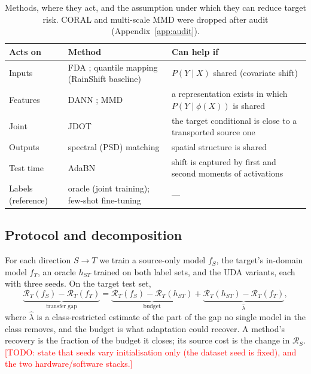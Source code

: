 \documentclass{article}
\newcommand{\todo}[1]{\textcolor{red}{[TODO: #1]}}
\newcommand{\lamhat}{\hat{\lambda}}
\begin{document}
\begin{table}[t]
\centering\small
\begin{tabularx}{\linewidth}{llX}
\toprule
Acts on & Method & Can help if \\
\midrule
Inputs   & FDA \citep{yang2020fda}; quantile mapping (RainShift baseline)
         & $P(Y\mid X)$ shared (covariate shift) \\
Features & DANN \citep{ganin2016domain}; MMD \citep{gretton2012kernel,long2015learning}
         & a representation exists in which $P(Y\mid\phi(X))$ is shared \\
Joint    & JDOT \citep{courty2017jdot,damodaran2018deepjdot}
         & the target conditional is close to a transported source one \\
Outputs  & spectral (PSD) matching
         & spatial structure is shared \\
Test time & AdaBN \citep{li2018adabn}
         & shift is captured by first and second moments of activations \\
\midrule
Labels (reference) & oracle (joint training); few-shot fine-tuning
         & --- \\
\bottomrule
\end{tabularx}
\caption{Methods, where they act, and the assumption under which they
can reduce target risk. CORAL and multi-scale MMD were dropped after
audit (Appendix~\ref{app:audit}).}
\label{tab:methods}
\end{table}

\subsection{Protocol and decomposition}\label{sec:protocol}

For each direction $S\to T$ we train a source-only model $f_S$, the
target's in-domain model $f_T$, an oracle $h_{ST}$ trained on both label
sets, and the UDA variants, each with three seeds. On the target test
set,
\begin{equation}
\underbrace{\mathcal{R}_T(f_S)-\mathcal{R}_T(f_T)}_{\text{transfer gap}}
=
\underbrace{\mathcal{R}_T(f_S)-\mathcal{R}_T(h_{ST})}_{\text{budget}}
+
\underbrace{\mathcal{R}_T(h_{ST})-\mathcal{R}_T(f_T)}_{\lamhat},
\label{eq:decomp}
\end{equation}
where $\lamhat$ is a class-restricted estimate of the part of the gap no
single model in the class removes, and the budget is what adaptation
could recover. A method's recovery is the fraction of the budget it
closes; its source cost is the change in $\mathcal{R}_S$.
\todo{state that seeds vary initialisation only (the dataset seed is
fixed), and the two hardware/software stacks.}
\end{document}
